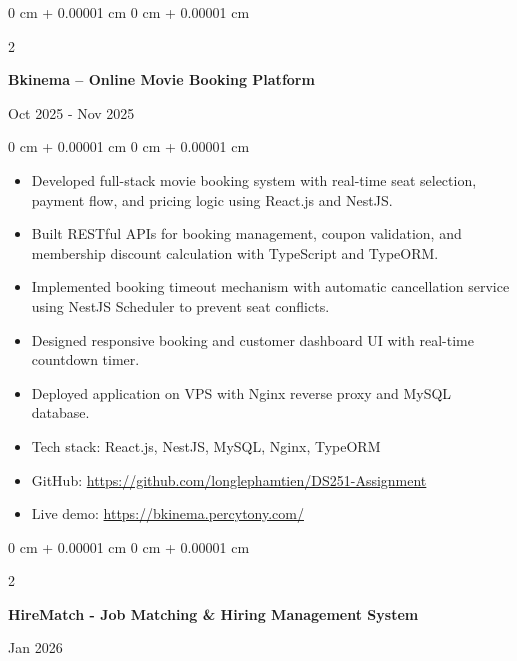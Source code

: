 \documentclass[10pt, letterpaper]{article}
\newenvironment{highlights}{
    \begin{itemize}[
        topsep=0.10 cm,
        parsep=0.10 cm,
        partopsep=0pt,
        itemsep=0pt,
        leftmargin=0 cm + 10pt
    ]
}
{
    \end{itemize}
}
\newenvironment{onecolentry}{
    \begin{adjustwidth}{
        0 cm + 0.00001 cm
    }{
        0 cm + 0.00001 cm
    }
}
{
    \end{adjustwidth}
}
\newenvironment{twocolentry}[2][]{
    \onecolentry
    \def\secondColumn{#2}
    \setcolumnwidth{\fill, 4.5 cm}
    \begin{paracol}{2}
}
{
    \switchcolumn \raggedleft \secondColumn
    \end{paracol}
    \endonecolentry
}
\begin{document}
\begin{twocolentry}{
    Oct 2025 - Nov 2025
}
    \textbf{Bkinema – Online Movie Booking Platform}
\end{twocolentry}

\vspace{0.10 cm}
\begin{onecolentry}
    \begin{highlights}
\item Developed full-stack movie booking system with real-time seat selection, payment flow, and pricing logic using React.js and NestJS.
\item Built RESTful APIs for booking management, coupon validation, and membership discount calculation with TypeScript and TypeORM.
\item Implemented booking timeout mechanism with automatic cancellation service using NestJS Scheduler to prevent seat conflicts.
\item Designed responsive booking and customer dashboard UI with real-time countdown timer.
\item Deployed application on VPS with Nginx reverse proxy and MySQL database.

\item Tech stack: React.js, NestJS, MySQL, Nginx, TypeORM
\item GitHub: \href{https://github.com/longlephamtien/DS251-Assignment}{https://github.com/longlephamtien/DS251-Assignment}
\item Live demo: \href{https://bkinema.percytony.com/}{https://bkinema.percytony.com/}
\end{highlights}

\end{onecolentry}
\vspace{0.1 cm}

\vspace{0.1 cm}
\begin{twocolentry}{
    Jan 2026
}
    \textbf{HireMatch - Job Matching \& Hiring Management System}
\end{twocolentry}
\end{document}
